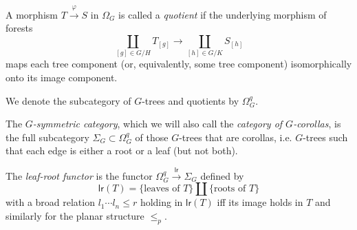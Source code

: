 \documentclass[a4paper,10pt]{article}%
\begin{document}
\begin{definition}
  A morphism $T \xrightarrow{\varphi} S$ in $\Omega_G$ is called a \textit{quotient} if the underlying morphism of forests
  \[\coprod_{[g]\in G/H} {T_{[g]} } 
  \to
  \coprod_{[h]\in G/K} {S_{[h]} } 
  \]
  maps each tree component (or, equivalently, some tree component) isomorphically onto its image component.

  We denote the subcategory of $G$-trees and quotients by $\Omega_G^q$.
\end{definition}


\begin{definition}
  The \textit{$G$-symmetric category}, which we will also call the \textit{category of $G$-corollas}, is the full subcategory 
  $\Sigma_G \subset \Omega_G^{q}$ of those $G$-trees that are corollas, i.e. $G$-trees such that each edge is either a root or a leaf (but not both).
\end{definition}


\begin{definition}
  The \textit{leaf-root functor} is the functor $\Omega_G^q \xrightarrow{\mathsf{lr}} \Sigma_G$ defined by 
  \[
  \mathsf{lr}(T)=\{\text{leaves of }T\}\amalg \{\text{roots of }T\}
  \]
  with a broad relation $l_1 \cdots l_n \leq r$ holding in 
  $\mathsf{lr}(T)$ iff its image holds in $T$ and similarly for the planar structure $\leq_p$.
\end{definition}
\end{document}
